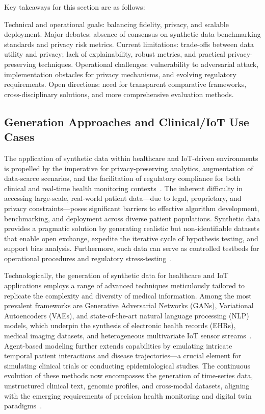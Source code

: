 \documentclass[sigconf]{acmart}
\begin{document}
Key takeaways for this section are as follows:

Technical and operational goals: balancing fidelity, privacy, and scalable deployment.
Major debates: absence of consensus on synthetic data benchmarking standards and privacy risk metrics.
Current limitations: trade-offs between data utility and privacy; lack of explainability, robust metrics, and practical privacy-preserving techniques.
Operational challenges: vulnerability to adversarial attack, implementation obstacles for privacy mechanisms, and evolving regulatory requirements.
Open directions: need for transparent comparative frameworks, cross-disciplinary solutions, and more comprehensive evaluation methods.

\subsection{Generation Approaches and Clinical/IoT Use Cases}

The application of synthetic data within healthcare and IoT-driven environments is propelled by the imperative for privacy-preserving analytics, augmentation of data-scarce scenarios, and the facilitation of regulatory compliance for both clinical and real-time health monitoring contexts~\cite{ref91,ref106}. The inherent difficulty in accessing large-scale, real-world patient data—due to legal, proprietary, and privacy constraints—poses significant barriers to effective algorithm development, benchmarking, and deployment across diverse patient populations. Synthetic data provides a pragmatic solution by generating realistic but non-identifiable datasets that enable open exchange, expedite the iterative cycle of hypothesis testing, and support bias analysis. Furthermore, such data can serve as controlled testbeds for operational procedures and regulatory stress-testing~\cite{ref91,ref106}.

Technologically, the generation of synthetic data for healthcare and IoT applications employs a range of advanced techniques meticulously tailored to replicate the complexity and diversity of medical information. Among the most prevalent frameworks are Generative Adversarial Networks (GANs), Variational Autoencoders (VAEs), and state-of-the-art natural language processing (NLP) models, which underpin the synthesis of electronic health records (EHRs), medical imaging datasets, and heterogeneous multivariate IoT sensor streams~\cite{ref91}. Agent-based modeling further extends capabilities by emulating intricate temporal patient interactions and disease trajectories—a crucial element for simulating clinical trials or conducting epidemiological studies. The continuous evolution of these methods now encompasses the generation of time-series data, unstructured clinical text, genomic profiles, and cross-modal datasets, aligning with the emerging requirements of precision health monitoring and digital twin paradigms~\cite{ref91,ref106}.
\end{document}
